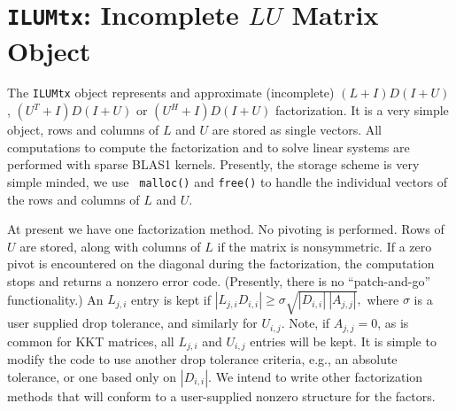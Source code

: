 \chapter{{\tt ILUMtx}: Incomplete $LU$ Matrix Object}
\label{chapter:ILUMtx}
\par
The {\tt ILUMtx} object represents and approximate (incomplete) 
$(L+I)D(I+U)$, $(U^T+I)D(I+U)$ or $(U^H+I)D(I+U)$ factorization.
It is a very simple object, rows and columns of $L$ and $U$ are
stored as single vectors. 
All computations to compute the factorization and to solve linear
systems are performed with sparse BLAS1 kernels.
Presently, the storage scheme is very simple minded, we use {\tt
malloc()} and {\tt free()} to handle the individual vectors of the
rows and columns of $L$ and $U$.
\par
At present we have one factorization method.
No pivoting is performed.
Rows of $U$ are stored, along with columns of $L$ if the matrix is
nonsymmetric.
If a zero pivot is encountered on the diagonal during the
factorization, the computation stops and returns a nonzero error
code.
(Presently, there is no ``patch-and-go'' functionality.)
An $L_{j,i}$ entry is kept if
$
|L_{j,i} D_{i,i}| \ge \sigma \sqrt{|D_{i,i}| \ |A_{j,j}|},
$
where $\sigma$ is a user supplied drop tolerance,
and similarly for $U_{i,j}$.
Note, if $A_{j,j} = 0$, as is common for KKT matrices,
all $L_{j,i}$ and $U_{i,j}$ entries will be kept.
It is simple to modify the code to use another drop tolerance
criteria, e.g., an absolute tolerance, or one based only on
$|D_{i,i}|$.
We intend to write other factorization methods that will
conform to a user-supplied nonzero structure for the factors.

